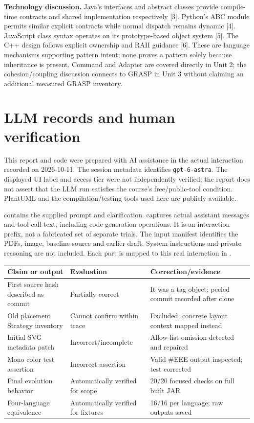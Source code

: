 \documentclass[11pt,a4paper]{article}
\begin{document}
\textbf{Technology discussion.} Java's interfaces and abstract classes provide
compile-time contracts and shared implementation respectively [3]. Python's ABC
module permits similar explicit contracts while normal dispatch remains dynamic
[4]. JavaScript class syntax operates on its prototype-based object system [5].
The C++ design follows explicit ownership and RAII guidance [6]. These are
language mechanisms supporting pattern intent; none proves a pattern solely
because inheritance is present. Command and Adapter are covered directly in
Unit 2; the cohesion/coupling discussion connects to GRASP in Unit 3 without
claiming an additional measured GRASP inventory.

\clearpage\section{LLM records and human verification}
This report and code were prepared with AI assistance in the actual interaction
recorded on 2026-10-11. The session metadata identifies \texttt{gpt-6-astra}.
The displayed UI label and access tier were not independently verified; the report
does not assert that the LLM run satisfies the course's free/public-tool condition.
PlantUML and the compilation/testing tools used here are publicly available.

 contains the supplied prompt and clarification.
 captures actual assistant messages and tool-call
text, including code-generation operations. It is an interaction prefix, not a
fabricated set of separate trials. The input manifest identifies the PDFs, image,
baseline source and earlier draft. System instructions and private reasoning are
not included. Each part is mapped to this real interaction in .

\begin{tabularx}{\linewidth}{@{}lXX@{}}\toprule
Claim or output & Evaluation & Correction/evidence\\\midrule
First source hash described as commit & Partially correct & It was a tag object; peeled commit recorded after clone\\
Old placement Strategy inventory & Cannot confirm within trace & Excluded; concrete layout context mapped instead\\
Initial SVG metadata patch & Incorrect/incomplete & Allow-list omission detected and repaired\\
Mono color test assertion & Incorrect assertion & Valid \#EEE output inspected; test corrected\\
Final evolution behavior & Automatically verified for scope & 20/20 focused checks on full built JAR\\
Four-language equivalence & Automatically verified for fixtures & 16/16 per language; raw outputs saved\\\bottomrule
\end{tabularx}
\end{document}
